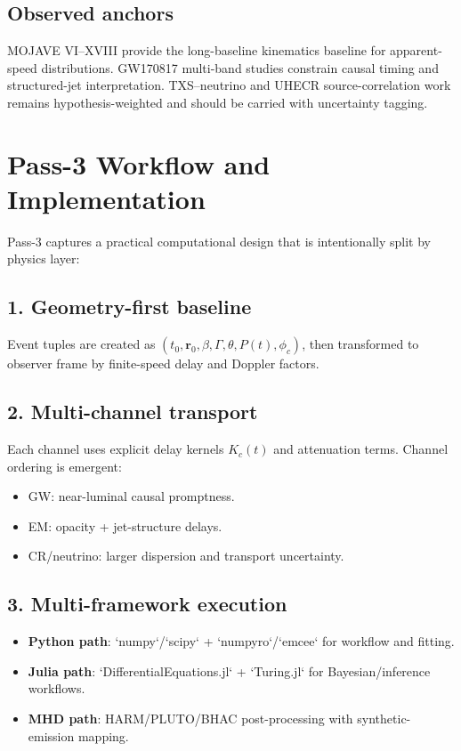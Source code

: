 \documentclass[11pt, oneside]{book}
\begin{document}
\section{Observed anchors}
MOJAVE VI--XVIII provide the long-baseline kinematics baseline for apparent-speed distributions.  
GW170817 multi-band studies constrain causal timing and structured-jet interpretation.  
TXS--neutrino and UHECR source-correlation work remains hypothesis-weighted and should be carried with uncertainty tagging.

\chapter{Pass-3 Workflow and Implementation}
Pass-3 captures a practical computational design that is intentionally split by physics layer:

\section{1. Geometry-first baseline}
Event tuples are created as
\((t_0,\mathbf r_0,\beta,\Gamma,\theta,P(t),\phi_c)\), then transformed to observer frame by finite-speed delay and Doppler factors.

\section{2. Multi-channel transport}
Each channel uses explicit delay kernels \(K_c(t)\) and attenuation terms.  
Channel ordering is emergent:
\begin{itemize}
  \item GW: near-luminal causal promptness.
  \item EM: opacity + jet-structure delays.
  \item CR/neutrino: larger dispersion and transport uncertainty.
\end{itemize}

\section{3. Multi-framework execution}
\begin{itemize}
  \item \textbf{Python path}: `numpy`/`scipy` + `numpyro`/`emcee` for workflow and fitting.
  \item \textbf{Julia path}: `DifferentialEquations.jl` + `Turing.jl` for Bayesian/inference workflows.
  \item \textbf{MHD path}: HARM/PLUTO/BHAC post-processing with synthetic-emission mapping.
\end{itemize}
\end{document}
